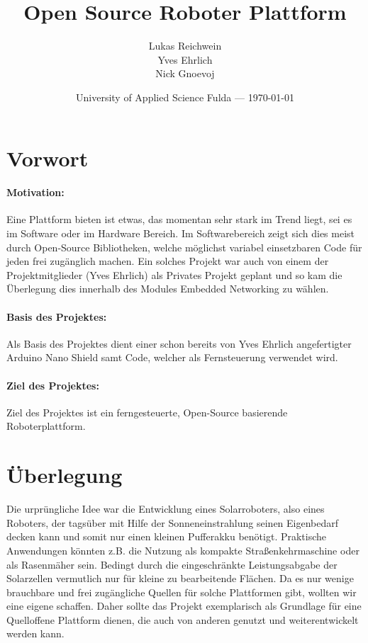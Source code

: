 \documentclass[12pt]{article}
\title{Open Source Roboter Plattform}
\author{Lukas Reichwein\\ Yves Ehrlich\\ Nick Gnoevoj}
\date{University of Applied Science Fulda --- \today}
\begin{document}
\maketitle %
\tableofcontents %
\newpage


\section{Vorwort} %
    \paragraph{Motivation: }
    Eine Plattform bieten ist etwas, das momentan sehr stark im Trend liegt, sei es im Software oder im Hardware Bereich. Im Softwarebereich zeigt sich dies meist durch Open-Source Bibliotheken, welche möglichst variabel einsetzbaren Code für jeden frei zugänglich machen.    
    Ein solches Projekt war auch von einem der Projektmitglieder (Yves Ehrlich) als Privates Projekt geplant und so kam die Überlegung dies innerhalb des Modules Embedded Networking zu wählen.
    \paragraph{Basis des Projektes: }
    Als Basis des Projektes dient einer schon bereits von Yves Ehrlich angefertigter Arduino Nano Shield samt Code,
    \cite{nanoGame} welcher als Fernsteuerung verwendet wird. 
    \paragraph{Ziel des Projektes: }	
	Ziel des Projektes ist ein ferngesteuerte, Open-Source basierende Roboterplattform.

\newpage    
\section{Überlegung}%

Die urprüngliche Idee war die Entwicklung eines Solarroboters, also eines Roboters, der tagsüber mit Hilfe der Sonneneinstrahlung seinen Eigenbedarf decken kann und somit nur einen kleinen Pufferakku benötigt.
Praktische Anwendungen könnten z.B. die Nutzung als kompakte Straßenkehrmaschine oder als Rasenmäher sein. Bedingt durch die eingeschränkte Leistungsabgabe der Solarzellen vermutlich nur für kleine zu bearbeitende Flächen.
Da es nur wenige brauchbare und frei zugängliche Quellen für solche Plattformen gibt, wollten wir eine eigene schaffen. Daher sollte das Projekt exemplarisch als Grundlage für eine Quelloffene Plattform dienen, die auch von anderen genutzt und weiterentwickelt werden kann.
\end{document}
